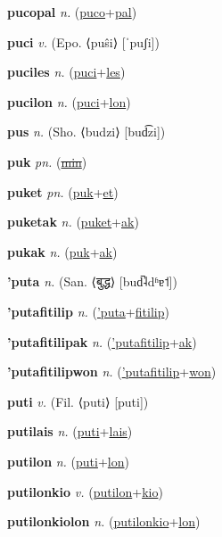 \textbf{\hypertarget{pucopal}{pucopal}} \textit{n.} (\hyperlink{puco}{puco}+\allowbreak \hyperlink{pal}{pal})


\textbf{\hypertarget{puci}{puci}} \textit{v.} (Epo. ⟨puŝi⟩ [ˈpuʃi])


\textbf{\hypertarget{puciles}{puciles}} \textit{n.} (\hyperlink{puci}{puci}+\allowbreak \hyperlink{les}{les})


\textbf{\hypertarget{pucilon}{pucilon}} \textit{n.} (\hyperlink{puci}{puci}+\allowbreak \hyperlink{lon}{lon})


\textbf{\hypertarget{pus}{pus}} \textit{n.} (Sho. ⟨budzi⟩ [bud͡zi])


\textbf{\hypertarget{puk}{puk}} \textit{pn.} (\hyperlink{min}{\sout{min}})


\textbf{\hypertarget{puket}{puket}} \textit{pn.} (\hyperlink{puk}{puk}+\allowbreak \hyperlink{et}{et})


\textbf{\hypertarget{puketak}{puketak}} \textit{n.} (\hyperlink{puket}{puket}+\allowbreak \hyperlink{ak}{ak})


\textbf{\hypertarget{pukak}{pukak}} \textit{n.} (\hyperlink{puk}{puk}+\allowbreak \hyperlink{ak}{ak})


\textbf{\hypertarget{'puta}{'puta}} \textit{n.} (San. ⟨{\devanagari{}बुद्ध}⟩ [bud̚˨dʱɐ˦])


\textbf{\hypertarget{'putafitilip}{'putafitilip}} \textit{n.} (\hyperlink{'puta}{'puta}+\allowbreak \hyperlink{fitilip}{fitilip})


\textbf{\hypertarget{'putafitilipak}{'putafitilipak}} \textit{n.} (\hyperlink{'putafitilip}{'putafitilip}+\allowbreak \hyperlink{ak}{ak})


\textbf{\hypertarget{'putafitilipwon}{'putafitilipwon}} \textit{n.} (\hyperlink{'putafitilip}{'putafitilip}+\allowbreak \hyperlink{won}{won})


\textbf{\hypertarget{puti}{puti}} \textit{v.} (Fil. ⟨puti⟩ [puti])


\textbf{\hypertarget{putilais}{putilais}} \textit{n.} (\hyperlink{puti}{puti}+\allowbreak \hyperlink{lais}{lais})


\textbf{\hypertarget{putilon}{putilon}} \textit{n.} (\hyperlink{puti}{puti}+\allowbreak \hyperlink{lon}{lon})


\textbf{\hypertarget{putilonkio}{putilonkio}} \textit{v.} (\hyperlink{putilon}{putilon}+\allowbreak \hyperlink{kio}{kio})


\textbf{\hypertarget{putilonkiolon}{putilonkiolon}} \textit{n.} (\hyperlink{putilonkio}{putilonkio}+\allowbreak \hyperlink{lon}{lon})


